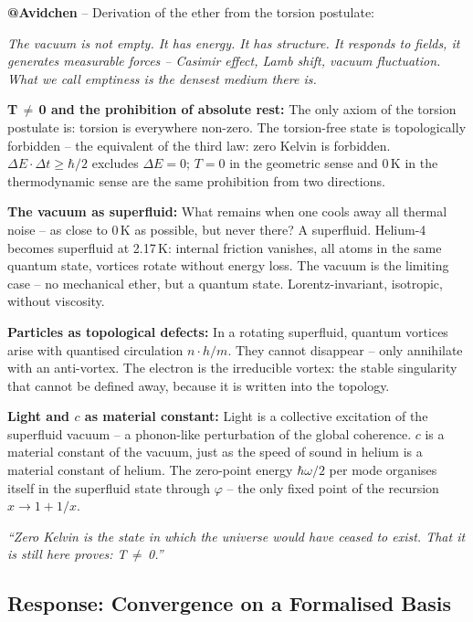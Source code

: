 \begin{avipost}
\textbf{@Avidchen} -- Derivation of the ether from the torsion postulate:

\medskip
\textit{The vacuum is not empty. It has energy. It has structure. It responds to fields, it generates measurable forces -- Casimir effect, Lamb shift, vacuum fluctuation. What we call emptiness is the densest medium there is.}

\medskip
\textbf{T\,$\neq$\,0 and the prohibition of absolute rest:} The only axiom of the torsion postulate is: torsion is everywhere non-zero. The torsion-free state is topologically forbidden -- the equivalent of the third law: zero Kelvin is forbidden. $\Delta E \cdot \Delta t \geq \hbar/2$ excludes $\Delta E = 0$; $T=0$ in the geometric sense and 0\,K in the thermodynamic sense are the same prohibition from two directions.

\medskip
\textbf{The vacuum as superfluid:} What remains when one cools away all thermal noise -- as close to 0\,K as possible, but never there? A superfluid. Helium-4 becomes superfluid at 2.17\,K: internal friction vanishes, all atoms in the same quantum state, vortices rotate without energy loss. The vacuum is the limiting case -- no mechanical ether, but a quantum state. Lorentz-invariant, isotropic, without viscosity.

\medskip
\textbf{Particles as topological defects:} In a rotating superfluid, quantum vortices arise with quantised circulation $n \cdot h/m$. They cannot disappear -- only annihilate with an anti-vortex. The electron is the irreducible vortex: the stable singularity that cannot be defined away, because it is written into the topology.

\medskip
\textbf{Light and $c$ as material constant:} Light is a collective excitation of the superfluid vacuum -- a phonon-like perturbation of the global coherence. $c$ is a material constant of the vacuum, just as the speed of sound in helium is a material constant of helium. The zero-point energy $\hbar\omega/2$ per mode organises itself in the superfluid state through $\varphi$ -- the only fixed point of the recursion $x \to 1 + 1/x$.

\medskip
\textit{``Zero Kelvin is the state in which the universe would have ceased to exist. That it is still here proves: T\,$\neq$\,0.''}
\end{avipost}

\subsection{Response: Convergence on a Formalised Basis}

